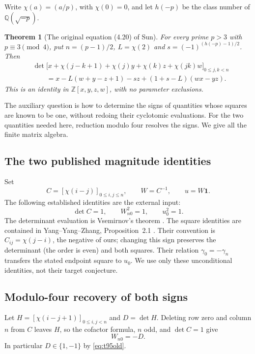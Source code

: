 \documentclass[11pt,a4paper]{article}
\newtheorem{theorem}{Theorem}[section]
\theoremstyle{definition}
\theoremstyle{remark}
\begin{document}
Write $\chi(a)=(a/p)$, with $\chi(0)=0$, and let $h(-p)$ be the class
number of $\mathbb Q(\sqrt{-p})$.

\begin{samepage}
\begin{theorem}[The original equation (4.20) of Sun]
\label{thm:t95sun48}
For every prime $p>3$ with $p\equiv3\pmod4$, put
$n=(p-1)/2$, $L=\chi(2)$ and $s=(-1)^{(h(-p)-1)/2}$. Then
\begin{align*}
&\det\bigl[x+\chi(j-k+1)+\chi(j)y+\chi(k)z+\chi(jk)w
                    \bigr]_{0\le j,k<n}\\
&\qquad=x-L(w+y-z+1)-sz+(1+s-L)(wx-yz).
\end{align*}
This is an identity in $\mathbb Z[x,y,z,w]$, with no parameter exclusions.
\end{theorem}
\end{samepage}

The auxiliary question is how to determine the signs of quantities whose
squares are known to be one, without redoing their cyclotomic evaluations.
For the two quantities needed here, reduction modulo four resolves the
signs. We give all the finite matrix algebra.

\subsection{The two published magnitude identities}
Set
\[
 C=[\chi(i-j)]_{0\le i,j\le n},\qquad
 W=C^{-1},\qquad u=W\mathbf1.
\]
The following established identities are the external input:
\begin{equation}\label{eq:t95old}
 \det C=1,\qquad W_{n0}^{2}=1,\qquad u_0^{2}=1.
\end{equation}
The determinant evaluation is Vsemirnov's theorem
\cite{t95vsemirnov}. The square identities are contained in
Yang--Yang--Zhang, Proposition~2.1 \cite{t95yyy2026}. Their convention is
$C_{ij}=\chi(j-i)$, the negative of ours; changing this sign preserves
the determinant (the order is even) and both squares. Their relation
$\gamma_0=-\gamma_n$ transfers the stated endpoint square to $u_0$.
We use only these unconditional identities, not their target conjecture.

\subsection{Modulo-four recovery of both signs}

Let $H=[\chi(i-j+1)]_{0\le i,j<n}$ and $D=\det H$.
Deleting row zero and column $n$ from $C$ leaves $H$, so the cofactor
formula, $n$ odd, and $\det C=1$ give
\begin{equation}\label{eq:t95corner}
 W_{n0}=-D.
\end{equation}
In particular $D\in\{1,-1\}$ by \eqref{eq:t95old}.
\end{document}
